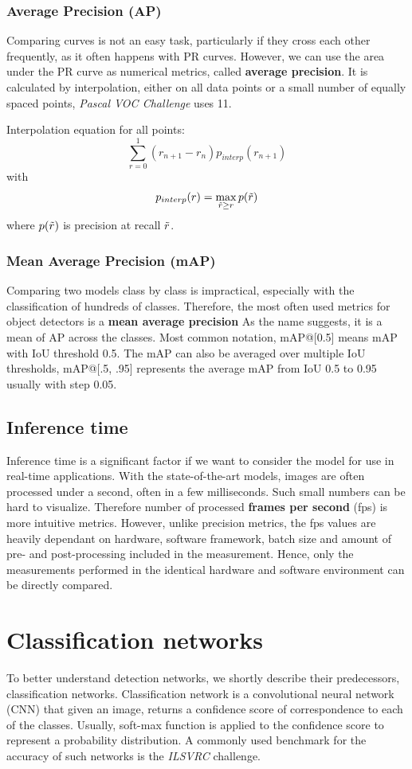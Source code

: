 \subsubsection{Average Precision (AP)}
Comparing curves is not an easy task, particularly if they cross each other frequently, as it often happens with PR curves. However, we can use the area under the PR curve as numerical metrics, called \textbf{average precision}. It is calculated by interpolation, either on all data points or a small number of equally spaced points, \textit{Pascal VOC Challenge} uses 11.

Interpolation equation for all points:
$$\sum_{r=0}^1 (r_{n+1} - r_n ) p_{interp}(r_{n+1})$$
with
$$p_{interp}(r) = \max_{\Tilde{r} \geq r} p(\Tilde{r})$$
where $p(\Tilde{r})$ is precision at recall $\Tilde{r}$.

\subsubsection{Mean Average Precision (mAP)}
Comparing two models class by class is impractical, especially with the classification of hundreds of classes. Therefore, the most often used metrics for object detectors is a \textbf{mean average precision} As the name suggests, it is a mean of AP across the classes. Most common notation, mAP@[0.5] means mAP with IoU threshold 0.5. The mAP can also be averaged over multiple IoU thresholds, mAP@[.5, .95] represents the average mAP from IoU 0.5 to 0.95 usually with step 0.05.

\subsection*{Inference time}
Inference time is a significant factor if we want to consider the model for use in real-time applications. With the state-of-the-art models, images are often processed under a second, often in a few milliseconds. Such small numbers can be hard to visualize. Therefore number of processed \textbf{frames per second} (fps) is more intuitive metrics. However, unlike precision metrics, the fps values are heavily dependant on hardware, software framework, batch size and amount of pre- and post-processing included in the measurement. Hence, only the measurements performed in the identical hardware and software environment can be directly compared.

\section{Classification networks}
\label{sec:clsnets}
To better understand detection networks, we shortly describe their predecessors, classification networks. Classification network is a convolutional neural network (CNN) \cite[ch.~9]{bib:dlbook} that given an image, returns a confidence score of correspondence to each of the classes. Usually, soft-max function is applied to the confidence score to represent a probability distribution. A commonly used benchmark for the accuracy of such networks is the \textit{ILSVRC} challenge.

